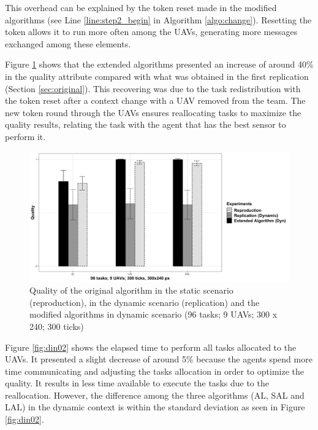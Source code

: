 This overhead can be explained by the token reset made in the modified algorithms (see Line \ref{line:step2_begin} in Algorithm \ref{algo:change}). Resetting the token allows it to run more often among the UAVs, generating more messages exchanged among these elements.

Figure \ref{fig:fig05} shows that the extended algorithms presented an increase of around 40\% in the quality attribute compared with what was obtained in the first replication (Section \ref{sec:original}). This recovering was due to the task redistribution with the token reset after a context change with a UAV removed from the team. The new token round through the UAVs ensures reallocating tasks to maximize the quality results, relating the task with the agent that has the best sensor to perform it.

\begin{figure}[h!]
	\begin{center}
		\includegraphics[scale=0.15]{fig/GRAPH07.png}
		\caption{Quality of the original algorithm in the static scenario (reproduction), in the dynamic scenario (replication) and the modified algorithms in dynamic scenario (96 tasks; 9 UAVs; 300 x 240; 300 ticks)}
		\label{fig:fig05}
	\end{center}
\end{figure}

 Figure \ref{fig:din02} shows the elapsed time to perform all tasks allocated to the UAVs. It presented a slight decrease of around 5\% because the agents spend more time communicating and adjusting the tasks allocation in order to optimize the quality. It results in less time available to execute the tasks due to the reallocation. However, the difference among the three algorithms (AL, SAL and LAL) in the dynamic context is within the standard deviation as seen in Figure \ref{fig:din02}.
 
